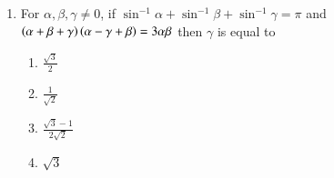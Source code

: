 \documentclass[journal]{IEEEtran}
\begin{document}
\begin{enumerate}
    \item For $\alpha, \beta, \gamma \ne 0$, if $\sin^{-1}\alpha + \sin^{-1}\beta + \sin^{-1}\gamma = \pi$
        and $\left(\alpha+\beta+\gamma\right)\left(\alpha-\gamma+\beta\right) = 3\alpha\beta$ then $\gamma$ is
    equal to

    \begin{multicols}{4}
\begin{enumerate}

        \item $\frac{\sqrt{3}}{2}$
        \item $\frac{1}{\sqrt{2}}$
        \item $\frac{\sqrt{3} - 1}{2\sqrt{2}}$
        \item $\sqrt{3}$
    \end{enumerate}
\end{multicols}
\end{enumerate}
\end{document}
